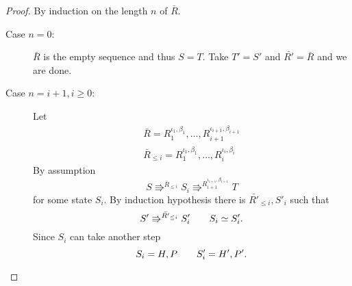 \begin{proof}
  By induction on the length $n$ of $\bar{R}$.
  \begin{description}
    \item[Case $n = 0$:] $\bar{R}$ is the empty sequence and thus $S = T$. Take
      $T' = S'$ and $\bar{R'} = \bar{R}$ and we are done.
    \item[Case $n = i + 1, i \geq 0$:] Let
      \begin{equation*}
        \begin{gathered}
          \bar{R} = R_1^{\iota_1, \beta_1}, \dots, R_{i+1}^{\iota_{i+1},
          \beta_{i+1}} \\
          \bar{R}_{\leq i} = R_1^{\iota_1, \beta_1}, \dots, R_{i}^{\iota_{i},
          \beta_{i}}
        \end{gathered}
      \end{equation*}
      By assumption
      \begin{equation*}
        S \Rrightarrow^{\bar{R}_{\leq i}} S_i \Rrightarrow^{R_{i+1}^{\iota_{i+1},
        \beta_{i+1}}} T
      \end{equation*}
      for some state $S_i$. By induction hypothesis there is $\bar{R'}_{\leq i}, S'_i$
      such that
      \begin{equation}
        S' \Rrightarrow^{\bar{R'}_{\leq i}} S'_i \quad\quad S_i \simeq S'_i.
      \end{equation}
      Since $S_i$ can take another step
      \begin{equation*}
        S_i = H, P \quad\quad S'_i = H', P'.
      \end{equation*}
      

\end{description}
\end{proof}
